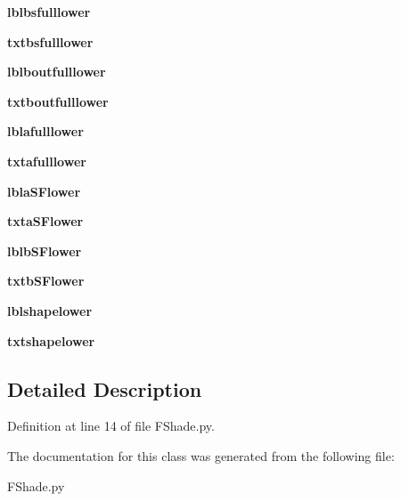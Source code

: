 \begin{DoxyCompactItemize}
{\bfseries lblbsfulllower}
\item 
\mbox{\label{class_f_shade_1_1_frm_shade_a533912d2ffc48d1032c6209f46443691}} 
{\bfseries txtbsfulllower}
\item 
\mbox{\label{class_f_shade_1_1_frm_shade_a9bfd57c389c6674fbc30ac2949475b26}} 
{\bfseries lblboutfulllower}
\item 
\mbox{\label{class_f_shade_1_1_frm_shade_afbd4ad837e08f465822e6daf709033d1}} 
{\bfseries txtboutfulllower}
\item 
\mbox{\label{class_f_shade_1_1_frm_shade_ad8f1f0ede6997aedf1c65790fd878abc}} 
{\bfseries lblafulllower}
\item 
\mbox{\label{class_f_shade_1_1_frm_shade_ac8623e08c5f993fd4ea02e356b56d8bc}} 
{\bfseries txtafulllower}
\item 
\mbox{\label{class_f_shade_1_1_frm_shade_aabb6c3a46372acf83ce076aa7577cd5e}} 
{\bfseries lbla\+S\+Flower}
\item 
\mbox{\label{class_f_shade_1_1_frm_shade_ac202e29870e8a2f3d4c1aa9c8d781cfa}} 
{\bfseries txta\+S\+Flower}
\item 
\mbox{\label{class_f_shade_1_1_frm_shade_a49c287b75ce07b9c1ee0001cdde3daab}} 
{\bfseries lblb\+S\+Flower}
\item 
\mbox{\label{class_f_shade_1_1_frm_shade_a6d8190aee3f7bf23eb54ca69468cd180}} 
{\bfseries txtb\+S\+Flower}
\item 
\mbox{\label{class_f_shade_1_1_frm_shade_ad5b055829b82a32cc5fc153fa22a1b6a}} 
{\bfseries lblshapelower}
\item 
\mbox{\label{class_f_shade_1_1_frm_shade_a0d43e851d8ceaaa1c7ed178234cdaa6a}} 
{\bfseries txtshapelower}
\end{DoxyCompactItemize}


\subsection{Detailed Description}


Definition at line 14 of file F\+Shade.\+py.



The documentation for this class was generated from the following file\+:\begin{DoxyCompactItemize}
\item 
F\+Shade.\+py\end{DoxyCompactItemize}
